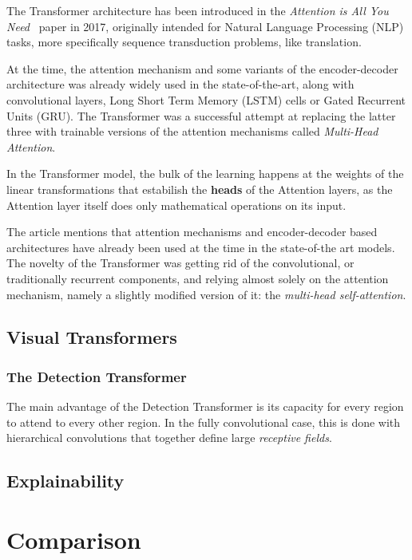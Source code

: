 The Transformer architecture has been introduced in the \textit{Attention is All You Need}~\cite{Transformer} paper in 2017, originally intended for Natural Language Processing (NLP) tasks, more specifically sequence transduction problems, like translation.

At the time, the attention mechanism and some variants of the encoder-decoder architecture was already widely used in the state-of-the-art, along with convolutional layers, Long Short Term Memory (LSTM) cells or Gated Recurrent Units (GRU). The Transformer was a successful attempt at replacing the latter three with trainable versions of the attention mechanisms called \textit{Multi-Head Attention}.

In the Transformer model, the bulk of the learning happens at the weights of the linear transformations that estabilish the \textbf{heads} of the Attention layers, as the Attention layer itself does only mathematical operations on its input. 

The article mentions that attention mechanisms and encoder-decoder based architectures have already been used at the time in the state-of-the art models. The novelty of the Transformer was getting rid of the convolutional, or traditionally recurrent components, and relying almost solely on the attention mechanism, namely a slightly modified version of it: the \textit{multi-head self-attention}.

\subsection{Visual Transformers}
\subsubsection{The Detection Transformer}

The main advantage of the Detection Transformer is its capacity for every region to attend to every other region. In the fully convolutional case, this is done with hierarchical convolutions that together define large \textit{receptive fields}.

\subsection{Explainability}

\section{Comparison}